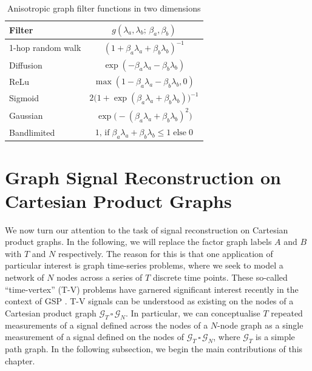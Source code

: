 \begin{table}[t]
    \vspace*{1cm}
    \def\arraystretch{1.8}
    \begin{center}
        \begin{tabular}{lc}
        \toprule
        \textbf{Filter}   & $g(\lambda_a, \lambda_b; \,\beta_a, \beta_b)$  \\
        \midrule
        1-hop random walk & $(1 + \beta_a \lambda_a + \beta_b \lambda_b)^{-1}$\\
        Diffusion         & $\exp(-\beta_a \lambda_a - \beta_b \lambda_b)$\\
        ReLu              & $\max (1 - \beta_a \lambda_a - \beta_b \lambda_b, 0)$ \\
        Sigmoid           & $2 \big( 1 + \exp(\beta_a \lambda_a + \beta_b \lambda_b)\big)^{-1}$\\
        Gaussian          & $\exp \big(-(\beta_a \lambda_a + \beta_b \lambda_b)^2\big)$\\
        Bandlimited       & $1, \,\text{if} \; \beta_a \lambda_a + \beta_b \lambda_b\leq 1 \; \text{else} \; 0$ \\
        \bottomrule
        \end{tabular}
    \end{center}
    \caption{Anisotropic graph filter functions in two dimensions}
    \label{tab:anis_filters_2d}
    \vspace*{1cm}
\end{table}






\section{Graph Signal Reconstruction on Cartesian Product Graphs}

\label{sec:gsr_cpg}

We now turn our attention to the task of signal reconstruction on Cartesian product graphs. In the following, we will replace the factor graph labels $A$ and $B$ with $T$ and $N$ respectively. The reason for this is that one application of particular interest is graph time-series problems, where we seek to model a network of $N$ nodes across a series of $T$ discrete time points. These so-called ``time-vertex'' (T-V) problems have garnered significant interest recently in the context of GSP \citep{Grassi2018, Isufi2017, Loukas2016}. T-V signals can be understood as existing on the nodes of a Cartesian product graph $\mathcal{G}_T \, \square \, \mathcal{G}_N$. In particular, we can conceptualise $T$ repeated measurements of a signal defined across the nodes of a $N$-node graph as a single measurement of a signal defined on the nodes of $\mathcal{G}_T \, \square \, \mathcal{G}_N$, where $\mathcal{G}_T$ is a simple path graph. In the following subsection, we begin the main contributions of this chapter. 



